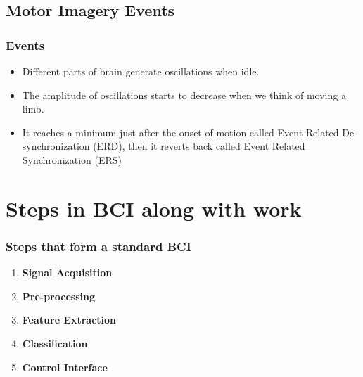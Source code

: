 \documentclass[11pt]{beamer}
\begin{document}
\subsection{Motor Imagery Events}
\begin{frame}
\frametitle{Events}
\begin{itemize}
[ball] 
\item Different parts of brain generate oscillations when idle.
\item The amplitude of oscillations starts to decrease when we think of moving a limb.
\item It reaches a minimum just after the onset of motion called Event Related De-synchronization (ERD), then it reverts back called Event Related Synchronization (ERS)
\end{itemize}
\end{frame}

\section{Steps in BCI along with work}
\begin{frame}
\frametitle{Steps that form a standard BCI}
\begin{enumerate}

\item   \textbf {Signal Acquisition }
\item \textbf {Pre-processing} 
\item \textbf {Feature Extraction}
\item \textbf {Classification }
\item \textbf {Control Interface}
\end{enumerate}
\end{frame}

\end{document}
